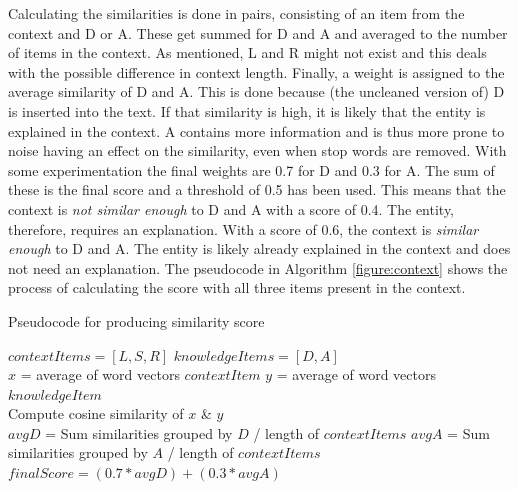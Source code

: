 \documentclass[
10pt, %
a4paper, %
oneside, %
headinclude,footinclude, %
] {book}%
\begin{document}
Calculating the similarities is done in pairs, consisting of an item from the context and D or A.
These get summed for D and A and averaged to the number of items in the context.
As mentioned, L and R might not exist and this deals with the possible difference in context length.
Finally, a weight is assigned to the average similarity of D and A.
This is done because (the uncleaned version of) D is inserted into the text.
If that similarity is high, it is likely that the entity is explained in the context.
A contains more information and is thus more prone to noise having an effect on the similarity, even when stop words are removed.
With some experimentation the final weights are 0.7 for D and 0.3 for A.
The sum of these is the final score and a threshold of 0.5 has been used.
This means that the context is \textit{not similar enough} to D and A with a score of 0.4.
The entity, therefore, requires an explanation.
With a score of 0.6, the context is \textit{similar enough} to D and A.
The entity is likely already explained in the context and does not need an explanation.
The pseudocode in Algorithm \ref{figure:context} shows the process of calculating the score with all three items present in the context.

\begin{algorithm}
  \caption{Pseudocode for producing similarity score\label{figure:context}}
  \begin{algorithmic}[1]
    \State $contextItems = [L, S, R]$
    \State $knowledgeItems = [D, A]$ \\

    \State $x$ = average of word vectors $contextItem$
    \State $y$ = average of word vectors $knowledgeItem$ \\

    \State Compute cosine similarity of $x$ \& $y$
    \EndFor
    \EndFor \\

    \State $avgD$ = Sum similarities grouped by $D$ / length of $contextItems$
    \State $avgA$ = Sum similarities grouped by $A$ / length of $contextItems$\\

    \State $finalScore = (0.7 * avgD) + (0.3 * avgA)$
  \end{algorithmic}
\end{algorithm}
\end{document}
